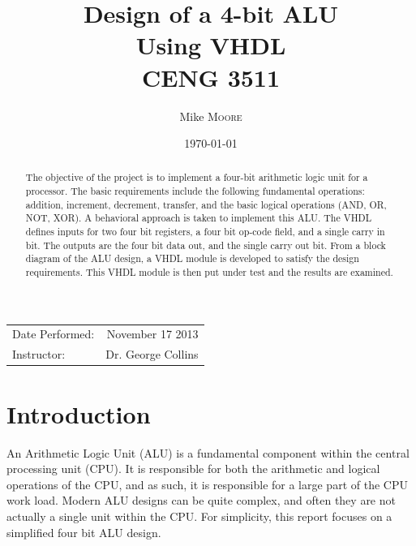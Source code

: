\documentclass{article}
\title{Design of a 4-bit ALU \\ Using VHDL \\ CENG 3511} %
\author{Mike \textsc{Moore}} %
\date{\today} %
\begin{document}
\maketitle %

\begin{center}
\begin{tabular}{l r}
Date Performed: & November 17 2013 \\ %
Instructor: & Dr. George Collins %
\end{tabular}
\end{center}




\begin{abstract}
The objective of the project is to implement a four-bit arithmetic logic unit for a
processor. The basic requirements include the following fundamental operations:
addition, increment, decrement, transfer, and the basic logical operations
(AND, OR, NOT, XOR). A behavioral approach is taken to implement this ALU. The VHDL
defines inputs for two four bit registers, a four bit op-code field, and a single 
carry in bit. The outputs are the four bit data out, and the single carry out bit. 
From a block diagram of the ALU design, a VHDL module is developed to satisfy the
design requirements. This VHDL module is then put under test and the results are 
examined.
\end{abstract}

\newpage

\tableofcontents

\newpage


\section{Introduction}

An Arithmetic Logic Unit (ALU) is a fundamental component within the central processing
unit (CPU). It is responsible for both the arithmetic and logical operations of the CPU,
and as such, it is responsible for a large part of the CPU work load. Modern ALU designs
can be quite complex, and often they are not actually a single unit within the CPU. For 
simplicity, this report focuses on a simplified four bit ALU design.
\end{document}
